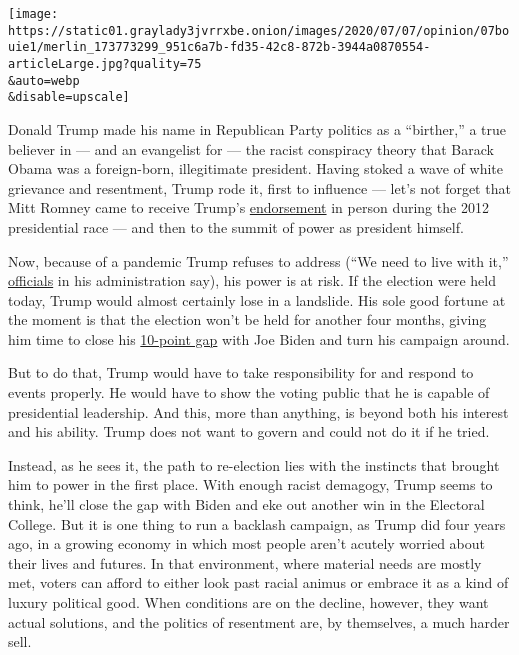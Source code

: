 \texttt{[image: https://static01.graylady3jvrrxbe.onion/images/2020/07/07/opinion/07bouie1/merlin\_173773299\_951c6a7b-fd35-42c8-872b-3944a0870554-articleLarge.jpg?quality=75\\\&auto=webp\\\&disable=upscale]}

Donald Trump made his name in Republican Party politics as a
``birther,'' a true believer in --- and an evangelist for --- the racist
conspiracy theory that Barack Obama was a foreign-born, illegitimate
president. Having stoked a wave of white grievance and resentment, Trump
rode it, first to influence --- let's not forget that Mitt Romney came
to receive Trump's \href{https://youtu.be/nmwzGMmGcJw}{endorsement} in
person during the 2012 presidential race --- and then to the summit of
power as president himself.

Now, because of a pandemic Trump refuses to address (``We need to live
with it,''
\href{https://www.nbcnews.com/politics/politics-news/we-need-live-it-white-house-readies-new-message-nation-n1232884}{officials}
in his administration say), his power is at risk. If the election were
held today, Trump would almost certainly lose in a landslide. His sole
good fortune at the moment is that the election won't be held for
another four months, giving him time to close his
\href{https://projects.fivethirtyeight.com/polls/}{10-point gap} with
Joe Biden and turn his campaign around.

But to do that, Trump would have to take responsibility for and respond
to events properly. He would have to show the voting public that he is
capable of presidential leadership. And this, more than anything, is
beyond both his interest and his ability. Trump does not want to govern
and could not do it if he tried.

Instead, as he sees it, the path to re-election lies with the instincts
that brought him to power in the first place. With enough racist
demagogy, Trump seems to think, he'll close the gap with Biden and eke
out another win in the Electoral College. But it is one thing to run a
backlash campaign, as Trump did four years ago, in a growing economy in
which most people aren't acutely worried about their lives and futures.
In that environment, where material needs are mostly met, voters can
afford to either look past racial animus or embrace it as a kind of
luxury political good. When conditions are on the decline, however, they
want actual solutions, and the politics of resentment are, by
themselves, a much harder sell.

